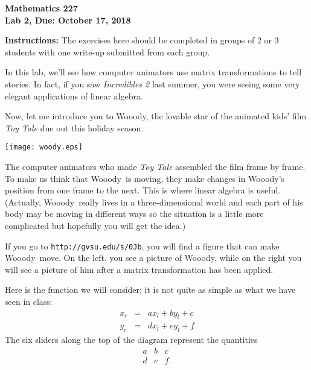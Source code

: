 \documentclass[12pt]{article}
\newcommand{\woodyn}{Wooody}
\newcommand{\woody}{Wooody\ }
\begin{document}
\noindent
{\bf Mathematics 227} \\ 
{\bf Lab 2, Due: October 17, 2018}

\bigskip

\noindent
{\bf Instructions:} The exercises here should be completed in groups
of 2 or 3 students with one write-up submitted from each group.

\medskip
In this lab, we'll see how computer
animators use matrix transformations to tell stories.  In fact, if you
saw {\em Incredibles 2} last summer, you were seeing some very elegant
applications of linear algebra.

Now, let me introduce you to \woodyn, the lovable star of the animated
kids' film {\em Toy Tale} due out this holiday season.  

\medskip
\begin{center}
  \texttt{[image: woody.eps]}
\end{center}
\medskip

The computer animators who made {\em Toy Tale} assembled the film
frame by frame.  To make us think that \woody is moving, they make
changes in \woodyn's position from one frame to the next.  This is
where linear algebra is useful.  (Actually, \woody really lives in a
three-dimensional world and each part of his body may be moving in
different ways so the situation is a little more complicated but
hopefully you will get the idea.)

If you go to {\tt http://gvsu.edu/s/0Jb}, you will find a figure that
can make \woody move.  On the left, you see a picture of \woodyn,
while on the right you will see a picture of him after a matrix
transformation has been applied.

Here is the function we will consider;  it is
not quite as simple as what we have seen in class:
\begin{eqnarray*}
x_r & = & ax_l + by_l + c \\
y_r & = & dx_l + ey_l + f
\end{eqnarray*}
The six sliders along the top of the diagram represent the quantities
$$\begin{array}{ccc}
a & b & c \\
d & e & f.
\end{array}
$$
\end{document}
